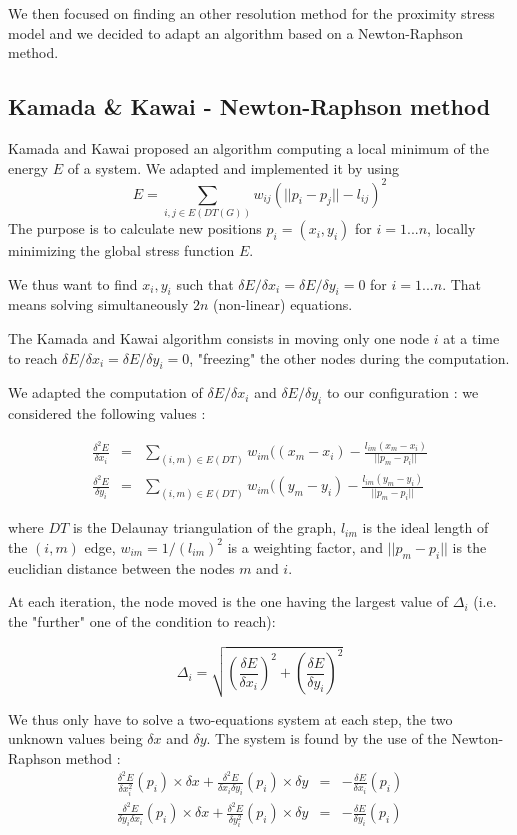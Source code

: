 \documentclass[12pt]{report}
\begin{document}
\bigskip
We then focused on finding an other resolution method for the proximity stress model and we decided to adapt an algorithm based on a Newton-Raphson method.

\subsection{Kamada \& Kawai - Newton-Raphson method}

Kamada and Kawai \cite{Kamada89} proposed an algorithm computing a local minimum of the energy $E$ of a system. We adapted and implemented it by using 
\[ E = \sum_{i,j \in E(DT(G))} w_{ij}(||p_i - p_j|| - l_{ij})^2 \]
The purpose is to calculate new positions $p_i = (x_i, y_i)$ for $i = 1... n$, locally minimizing the global stress function $E$. 

We thus want to find $x_i, y_i$ such that $\delta E / \delta x_i = \delta E / \delta y_i = 0$ for $i = 1... n$. That means solving simultaneously $2n$ (non-linear) equations.

\bigskip
The Kamada and Kawai algorithm consists in moving only one node $i$ at a time to reach $\delta E / \delta x_i = \delta E / \delta y_i = 0$, "freezing" the other nodes during the computation.

We adapted the computation of $\delta E / \delta x_i$ and $\delta E / \delta y_i$ to our configuration : we considered the following values :

\begin{eqnarray*}
\frac{\delta^2 E}{\delta x_i}  & = & \sum_{(i,m) \in E(DT)} w_{im} ( (x_m - x_i) - \frac{l_{im} (x_m - x_i)}{||p_m - p_i||} \\
\frac{\delta^2 E}{\delta y_i}  & = & \sum_{(i,m) \in E(DT)} w_{im} ( (y_m - y_i) - \frac{l_{im} (y_m - y_i)}{||p_m - p_i||}
\end{eqnarray*}
 
where $DT$ is the Delaunay triangulation of the graph, $l_{im}$ is the ideal length of the $(i,m)$ edge, $w_{im} = 1/(l_{im})^2 $ is a weighting factor, and $||p_m - p_i||$ is the euclidian distance between the nodes $m$ and $i$.

At each iteration, the node moved is the one having the largest value of $\Delta_i$ (i.e. the "further" one of the condition to reach):

\[\Delta_i = \sqrt{\left(\frac{\delta E}{\delta x_i}\right)^2 + \left(\frac{\delta E}{\delta y_i}\right)^2} \]

\bigskip
We thus only have to solve a two-equations system at each step, the two unknown values being $\delta x$ and $\delta y$. The system is found by the use of the Newton-Raphson method :
\begin{eqnarray}
\label{eq1}
\frac{\delta^2 E}{\delta x_i^2}(p_i) \times \delta x +  \frac{\delta^2 E}{\delta x_i \delta y_i}(p_i) \times \delta y  & = & - \frac{\delta E}{\delta x_i} (p_i) \\
\frac{\delta^2 E}{\delta y_i \delta x_i}(p_i) \times \delta x +  \frac{\delta^2 E}{\delta y_i^2}(p_i) \times \delta y & = & - \frac{\delta E}{\delta y_i} (p_i)
\label{eq2}
\end{eqnarray}
\end{document}
